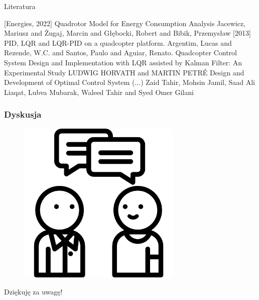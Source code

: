 \documentclass[aspectratio=169]{beamer}
\begin{document}
\begin{frame}{Literatura}
\begin{thebibliography}{10}
\beamertemplatebookbibitems
{}[Energies, 2022] Quadrotor Model for Energy Consumption Analysis
   \newblock  Jacewicz, Mariusz and Żugaj, Marcin and Głębocki, Robert and Bibik, Przemysław
 [2013] PID, LQR and LQR-PID on a quadcopter platform.
 \newblock  Argentim, Lucas and Rezende, W.C. and Santos, Paulo and Aguiar, Renato.
   Quadcopter Control System Design and Implementation with LQR assisted by Kalman Filter: An Experimental Study
\newblock LUDWIG HORVATH and MARTIN PETRÉ
 Design and Development of Optimal Control System (...)
\newblock Zaid Tahir, Mohsin Jamil, Saad Ali Liaqat, Lubva Mubarak, Waleed Tahir and Syed Omer Gilani
\end{thebibliography}
\end{frame}

\begin{frame}
	\frametitle{Dyskusja}
	\begin{figure}
		\centering
		\includegraphics[width=0.7\textwidth]{questions.png}
	\end{figure}
\end{frame}

\begin{frame}
	  \begin{center}
	\Huge Dziękuję za uwagę!
	\end{center}
\end{frame}
\end{document}
